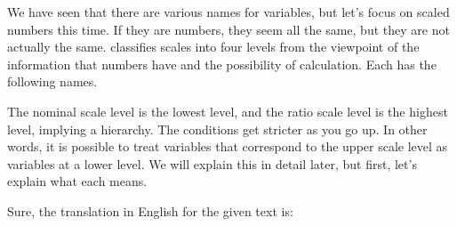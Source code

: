 \documentclass{ltjsbook}
\begin{document}
We have seen that there are various names for variables, but let's focus on scaled numbers this time. If they are numbers, they seem all the same, but they are not actually the same. \textcite{stevens1946} classifies scales into four levels from the viewpoint of the information that numbers have and the possibility of calculation. Each has the following names.


The nominal scale level is the lowest level, and the ratio scale level is the highest level, implying a hierarchy. The conditions get stricter as you go up. In other words, it is possible to treat variables that correspond to the upper scale level as variables at a lower level. We will explain this in detail later, but first, let's explain what each means.

Sure, the translation in English for the given text is:
\end{document}
